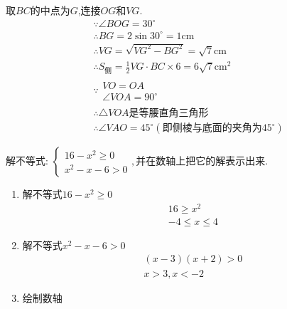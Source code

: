 \begin{questions}
\begin{solution}
		取$BC$的中点为$G$,连接$OG$和$VG$.
		\begin{align*}
			 & \because \angle{BOG} = 30^\circ                                             \\
			 & \therefore BG = 2\sin30^\circ = 1 \text{cm}                                 \\
			 & \therefore VG = \sqrt{VG^2 - BG^2} = \sqrt{7}\text{cm}                      \\
			 & \therefore S_{\text{侧}} = \frac12VG\cdot BC \times 6 = 6\sqrt{7}\text{cm}^2 \\
			 & \because
			\begin{array}{l}
				VO = OA \\
				\angle{VOA} = 90^\circ
			\end{array}                                                          \\
			 & \therefore \triangle{VOA}\text{是等腰直角三角形}                                    \\
			 & \therefore \angle{VAO} = 45^\circ (\text{即侧棱与底面的夹角为}45^\circ)
		\end{align*}
	\end{solution}

	\question 解不等式: 	\begin{math}
		\begin{cases}
			16 - x^2 \geqslant 0 \\
			x^2 - x - 6 > 0
		\end{cases},并在数轴上把它的解表示出来.
	\end{math}
	\begin{solution}
		\begin{enumerate}[label=\Roman*.]
			\item 解不等式$16 - x^2 \geqslant 0$
			      \begin{align*}
				      16  \geqslant x^2 \\
				      -4 \leqslant x \leqslant 4
			      \end{align*}
			\item 解不等式$x^2 - x - 6 > 0$
			      \begin{align*}
				      (x-3)(x+2) > 0 \\
				      x > 3, x < -2
			      \end{align*}
			\item 绘制数轴

\end{enumerate}
\end{solution}
\end{questions}
